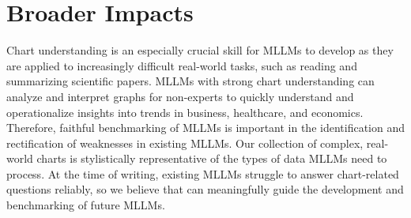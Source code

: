 \section{Broader Impacts}
\label{lim_and_impacts}
Chart understanding is an especially crucial skill for MLLMs to develop as they are applied to increasingly difficult real-world tasks, such as reading and summarizing scientific papers.
MLLMs with strong chart understanding can analyze and interpret graphs for non-experts to quickly understand and operationalize insights into trends in business, healthcare, and economics.
Therefore, faithful benchmarking of MLLMs is important in the identification and rectification of weaknesses in existing MLLMs.
Our collection of complex, real-world charts is stylistically representative of the types of data MLLMs need to process.
At the time of writing, existing MLLMs struggle to answer chart-related questions reliably, so we believe that \ours{} can meaningfully guide the development and benchmarking of future MLLMs.

